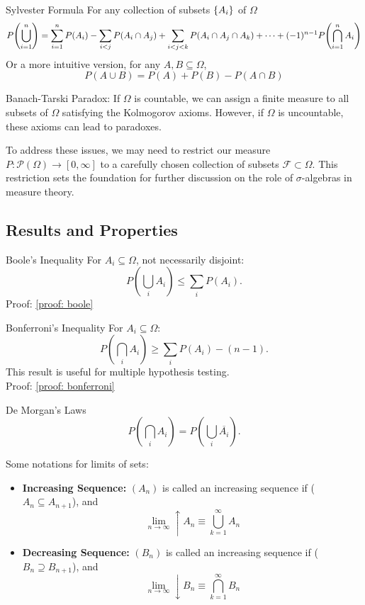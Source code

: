 \begin{cor}{Sylvester Formula}
For any collection of subsets $\qty{A_i}$ of $\Omega$
$$P\qty(\bigcup_{i=1}^n) = \sum_{i=1}^nP(A_i) - \sum_{i<j}P(A_i\cap A_j) + \sum_{i<j<k}P(A_i\cap A_j\cap A_k) + \dots + (-1)^{n-1}P\qty(\bigcap_{i=1}^nA_i)$$
Or a more intuitive version, for any $A, B\subseteq \Omega$, 
$$P(A\cup B) = P(A)+P(B)-P(A\cap B)$$
\end{cor}

\begin{rmk}{Banach-Tarski Paradox:}
If \(\Omega\) is countable, we can assign a finite measure to all subsets of \(\Omega\) satisfying the Kolmogorov axioms. However, if \(\Omega\) is uncountable, these axioms can lead to paradoxes.
\end{rmk}

\noindent To address these issues, we may need to restrict our measure $P: \mathscr{P}(\Omega)\rightarrow [0, \infty]$ to a carefully chosen collection of subsets $\mathcal{F}\subset \Omega$. This restriction sets the foundation for further discussion on the role of $\sigma$-algebras in measure theory.

\subsection{Results and Properties}

\begin{prop}{Boole's Inequality}
For \(A_i \subseteq \Omega\), not necessarily disjoint:
\[
P\left(\bigcup_i A_i\right) \leq \sum_i P(A_i).
\]
Proof: \ref{proof: boole}
\end{prop}

\begin{prop}{Bonferroni's Inequality}
For \(A_i \subseteq \Omega\):
\[
P\left(\bigcap_i A_i\right) \geq \sum_i P(A_i) - (n-1).
\]
This result is useful for multiple hypothesis testing.\\
Proof: \ref{proof: bonferroni}
\end{prop}

\begin{prop}{De Morgan's Laws}
\[
P\left(\bigcap_i A_i\right) = P\left(\bigcup_i \overline{A_i}\right).
\]
\end{prop}

\noindent Some notations for limits of sets:  
\begin{itemize}
	\item \textbf{Increasing Sequence: }\((A_n)\) is called an increasing sequence if (\(A_n \subseteq A_{n+1}\)), and 
	$$\lim_{n\to \infty} \uparrow A_n \equiv \bigcup_{k=1}^\infty A_n$$
	\item \textbf{Decreasing Sequence: }\((B_n)\) is called an increasing sequence if (\(B_n \supseteq B_{n+1}\)), and 
	$$\lim_{n\to \infty} \downarrow B_n \equiv \bigcap_{k=1}^\infty B_n$$
\end{itemize}

